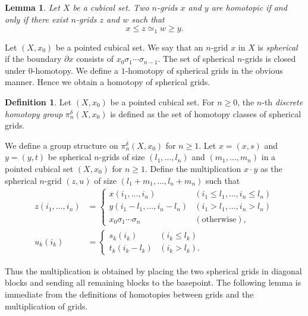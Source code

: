 \documentclass[oneside, 12pt]{amsart}
\numberwithin{equation}{section}
\theoremstyle{plain}
\newtheorem{lemma}[theorem]{Lemma}
\theoremstyle{definition}
\newtheorem{definition}[theorem]{Definition}
\theoremstyle{remark}
\begin{document}
	
	
	\begin{lemma}
		\label{homotopy description}
		Let $X$ be a cubical set. Two $n$-grids $x$ and $y$ are homotopic if and only if there exist $n$-grids $z$ and $w$ such that
		\[
		x\le z\simeq_1 w\ge y.
		\]
	\end{lemma}
	
	
	
	Let $(X,x_0)$ be a pointed cubical set. We say that an $n$-grid $x$ in $X$ is \emph{spherical} if the boundary $\partial x$ consists of $x_0\sigma_{1}\cdots\sigma_{n-1}$. The set of spherical $n$-grids is closed under $0$-homotopy. We define a $1$-homotopy of spherical grids in the obvious manner. Hence we obtain a homotopy of spherical grids.
	
	
	
	\begin{definition}
		Let $(X,x_0)$ be a pointed cubical set. For $n\ge 0$, the $n$-th \emph{discrete homotopy group} $\pi_n^\delta(X,x_0)$ is defined as the set of homotopy classes of spherical grids.
	\end{definition}
	
	
	
	We define a group structure on $\pi_n^\delta(X,x_0)$ for $n\ge 1$. Let $x=(x,s)$ and $y=(y,t)$ be spherical $n$-grids of size $(l_1,\ldots,l_n)$ and $(m_1,\ldots,m_n)$ in a pointed cubical set $(X,x_0)$ for $n\ge 1$. Define the multiplication $x\cdot y$ as the spherical $n$-grid $(z,u)$ of size $(l_1+m_1,\ldots,l_n+m_n)$ such that
	\begin{align*}
		z(i_1,\ldots,i_n)&=
		\begin{cases}
			x(i_1,\ldots,i_n)&(i_1\le l_1,\ldots,i_n\le l_n)\\
			y(i_1-l_1,\ldots,i_n-l_n)&(i_1>l_1,\ldots,i_n>l_n)\\
			x_0\sigma_1\cdots\sigma_n&(\text{otherwise}),
		\end{cases}\\
		u_k(i_k)&=
		\begin{cases}
			s_k(i_k)&(i_k\le l_k)\\
			t_k(i_k-l_k)&(i_k>l_k).
		\end{cases}
	\end{align*}
	
	
	Thus the multiplication is obtained by placing the two spherical grids in diagonal blocks and sending all remaining blocks to the basepoint. The following lemma is immediate from the definitions of homotopies between grids and the multiplication of grids.
	
\end{document}
